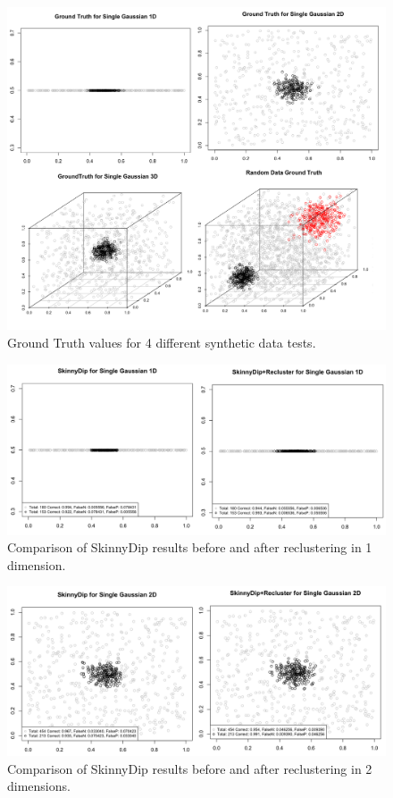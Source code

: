 \documentclass{sig-alternate-05-2015}
\begin{document}
\begin{figure}[t]
\centering
\includegraphics[width=\textwidth]{images/fourGTs}
\caption{Ground Truth values for 4 different synthetic data tests.}
\label{fig:fourGTs}
\end{figure}

\begin{figure}[t]
\centering
\includegraphics[width=\textwidth]{images/1Dcompare}
\caption{Comparison of SkinnyDip results before and after reclustering in 1 dimension.}
\label{fig:1Dcompare}
\end{figure}

\begin{figure}[t]
\centering
\includegraphics[width=\textwidth]{images/2Dcompare}
\caption{Comparison of SkinnyDip results before and after reclustering in 2 dimensions.}
\label{fig:2Dcompare}
\end{figure}
\end{document}
